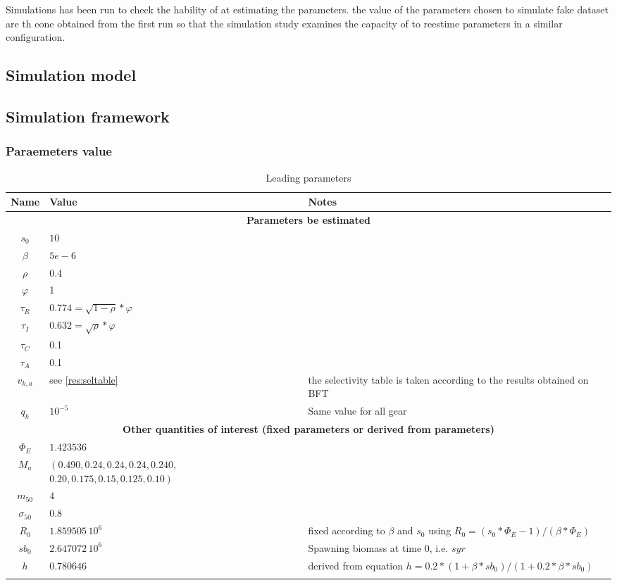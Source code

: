 Simulations has been run to check the hability of \iscam at estimating
the parameters. the value of the parameters chosen to simulate fake dataset are th eone obtained from the first run so that the simulation study examines 
the capacity of \iscam to reestime parameters in a similar configuration.
\subsection{Simulation model}
\subsection{Simulation framework}
\subsubsection{Paraemeters value}
\begin{table}[ht]
\centering
\begin{tabular}{ c  p{4cm}  p{8cm} }
  \hline
Name & Value & Notes \\ 
  \hline
\multicolumn{3}{c}{\bf Parameters be estimated}\\
$s_0$ & $10$ & \\
$\beta$ & $5e-6$ & \\
$\rho$ & 0.4 & \\
$\varphi$ & 1 & \\
$\tau_R$ & $0.774=\sqrt{1-\rho} * \varphi$ & \\
$\tau_I$ & $0.632=\sqrt{\rho} * \varphi$ & \\
$\tau_C$&0.1 &\\
$\tau_A$ & 0.1 & \\
$v_{k,a}$&  see \ref{res:seltable}  & the  selectivity table  is taken
according to the results obtained on BFT \\
$q_k$ & $10^{-5}$ & Same value for all gear\\
\multicolumn{3}{c}{\bf Other quantities  of interest (fixed parameters
  or derived from parameters)}\\
$\Phi_E$ & $1.423536 $ & \\
$M_a$ & $\left(0.490,0.24, 0.24, 0.24, 0.240,\right.$ $\left. 0.20, 
0.175 , 0.15, 0.125, 0.10\right)$&\\
$m_{50}$& $4$&\\
$\sigma_{50}$& $0.8$&\\
$R_0$ &  $1.859505\, 10^6$ & fixed  according to $\beta$ and  $s_0$ using
$R_0= (s_0*\Phi_E-1)/(\beta*\Phi_E)$ \\
$sb_0$ & $2.647072 \, 10^6$ & Spawning biomass at time 0, i.e. $syr$\\
$ h $ & $0.780646$ & derived from equation $h= 0.2 * (1+\beta*sb_0)/(1+0.2*\beta*sb_0)$\\

\\ \hline
\end{tabular}
\caption{Leading parameters}
\end{table}


